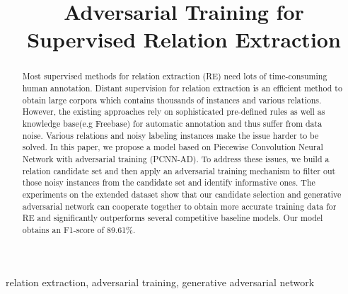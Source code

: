 \documentclass[conference]{IEEEtran}
\begin{document}
\title{Adversarial Training for Supervised Relation Extraction}

\author{
\and
{}
\and
{}
}

\maketitle

\begin{abstract}
  Most supervised methods for relation extraction (RE) need lots of time-consuming human annotation.
Distant supervision for relation extraction is an efficient method to obtain large corpora which contains thousands of instances and various relations.
However, the existing approaches rely on sophisticated pre-defined rules as well as knowledge base(e.g Freebase) for automatic annotation and thus suffer from data noise.
Various relations and noisy labeling instances make the issue harder to be solved.
In this paper, we propose a model based on Piecewise Convolution Neural Network with adversarial training (PCNN-AD).
To address these issues, we build a relation candidate set and then apply an adversarial training mechanism to filter out those noisy instances from the candidate set and identify informative ones.
The experiments on the extended dataset show that our candidate selection and generative adversarial network can cooperate together to obtain more accurate training data for RE and significantly outperforms several competitive baseline models.
Our model obtains an F1-score of 89.61\%.
\end{abstract}

\begin{IEEEkeywords}
relation extraction, adversarial training, generative adversarial network
\end{IEEEkeywords}
\end{document}
